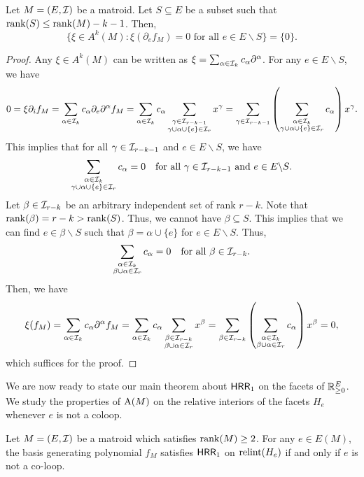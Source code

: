\documentclass{puthesis-UG}
\begin{document}
\begin{thm} \label{higher-degree-socles}
	Let $M = (E, \mathcal{I})$ be a matroid. Let $S \subseteq E$ be a subset such that $\operatorname{rank}(S) \leq \operatorname{rank}(M) - k - 1$. Then, 
	\[
		\{\xi \in A^k(M) : \xi (\partial_e f_M) = 0 \text{ for all } e \in E \backslash S\} = \{0\}.
	\]
\end{thm}

\begin{proof}
	Any $\xi \in A^k(M)$ can be written as $\xi = \sum_{\alpha \in \mathcal{I}_k} c_\alpha \partial^\alpha$. For any $e \in E \backslash S$, we have 
	\begin{align*}
		0 = \xi \partial_i f_M = \sum_{\alpha \in \mathcal{I}_k} c_\alpha \partial_e \partial^\alpha f_M = \sum_{\alpha \in \mathcal{I}_k} c_\alpha \sum_{\substack{\gamma \in \mathcal{I}_{r-k-1} \\ \gamma \cup \alpha \cup \{e\} \in \mathcal{I}_r}} x^\gamma = \sum_{\gamma \in \mathcal{I}_{r-k-1}} \left ( \sum_{\substack{\alpha \in \mathcal{I}_k \\ \gamma \cup \alpha \cup \{e\} \in \mathcal{I}_r}} c_\alpha \right ) x^\gamma.
	\end{align*}
	This implies that for all $\gamma \in \mathcal{I}_{r-k-1}$ and $e \in E \backslash S$, we have 
	\[
		\sum_{\substack{\alpha \in \mathcal{I}_k \\ \gamma \cup \alpha \cup \{e\} \in \mathcal{I}_r}} c_\alpha = 0 \quad \text{for all $\gamma \in \mathcal{I}_{r-k-1}$ and $e \in E \backslash S$.}
	\]
	Let $\beta \in \mathcal{I}_{r-k}$ be an arbitrary independent set of rank $r-k$. Note that $\operatorname{rank} (\beta) = r-k > \operatorname{rank} (S)$. Thus, we cannot have $\beta \subseteq S$. This implies that we can find $e \in \beta \backslash S$ such that $\beta = \alpha \cup \{e\}$ for $e \in E \backslash S$. Thus, 
	\[
		\sum_{\substack{\alpha \in \mathcal{I}_k \\ \beta \cup \alpha \in \mathcal{I}_r}} c_\alpha = 0 \quad \text{for all $\beta \in \mathcal{I}_{r-k}$}.
	\]
	Then, we have 
	\[
		\xi (f_M) = \sum_{\alpha \in \mathcal{I}_k} c_\alpha \partial^\alpha f_M = \sum_{\alpha \in \mathcal{I}_k} c_\alpha \sum_{\substack{\beta \in \mathcal{I}_{r-k} \\ \beta \cup \alpha \in \mathcal{I}_r}} x^\beta = \sum_{\beta \in \mathcal{I}_{r-k}} \left ( \sum_{\substack{\alpha \in \mathcal{I}_k \\ \beta \cup \alpha \in \mathcal{I}_r}} c_\alpha \right ) x^\beta = 0,
	\]
	which suffices for the proof. 
\end{proof}

We are now ready to state our main theorem about $\mathsf{HRR}_1$ on the facets of $\mathbb{R}_{\geq 0}^E$. We study the properties of $\operatorname{A}(M)$ on the relative interiors of the facets $H_e$ whenever $e$ is not a coloop. 
\begin{thm} \label{main-theorem}
	Let $M = (E, \mathcal{I})$ be a matroid which satisfies $\operatorname{rank} (M) \geq 2$. For any $e \in E(M)$, the basis generating polynomial $f_M$ satisfies $\mathsf{HRR}_1$ on $\operatorname{relint} (H_e)$ if and only if $e$ is not a co-loop.
\end{thm}
\end{document}
